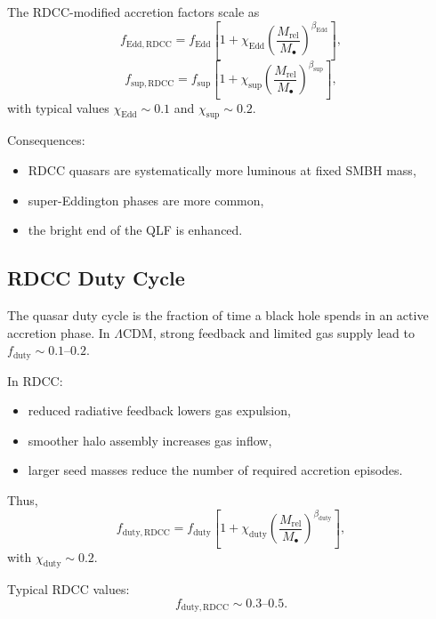 \documentclass[11pt,a4paper]{article}
\begin{document}
The RDCC-modified accretion factors scale as
\begin{equation}
f_{\mathrm{Edd,RDCC}}
=
f_{\mathrm{Edd}}
\left[
1
+
\chi_{\mathrm{Edd}}
\left(
\frac{M_{\mathrm{rel}}}{M_{\bullet}}
\right)^{\beta_{\mathrm{Edd}}}
\right],
\end{equation}
\begin{equation}
f_{\mathrm{sup,RDCC}}
=
f_{\mathrm{sup}}
\left[
1
+
\chi_{\mathrm{sup}}
\left(
\frac{M_{\mathrm{rel}}}{M_{\bullet}}
\right)^{\beta_{\mathrm{sup}}}
\right],
\end{equation}
with typical values $\chi_{\mathrm{Edd}} \sim 0.1$ and $\chi_{\mathrm{sup}} \sim 0.2$.

Consequences:
\begin{itemize}
\item RDCC quasars are systematically more luminous at fixed SMBH mass,
\item super-Eddington phases are more common,
\item the bright end of the QLF is enhanced.
\end{itemize}

\subsection{RDCC Duty Cycle}

The quasar duty cycle is the fraction of time a black hole spends in an active accretion phase.
In $\Lambda$CDM, strong feedback and limited gas supply lead to
$f_{\mathrm{duty}} \sim 0.1$–$0.2$.

In RDCC:
\begin{itemize}
\item reduced radiative feedback lowers gas expulsion,
\item smoother halo assembly increases gas inflow,
\item larger seed masses reduce the number of required accretion episodes.
\end{itemize}

Thus,
\begin{equation}
f_{\mathrm{duty,RDCC}}
=
f_{\mathrm{duty}}
\left[
1
+
\chi_{\mathrm{duty}}
\left(
\frac{M_{\mathrm{rel}}}{M_{\bullet}}
\right)^{\beta_{\mathrm{duty}}}
\right],
\end{equation}
with $\chi_{\mathrm{duty}} \sim 0.2$.

Typical RDCC values:
\begin{equation}
f_{\mathrm{duty,RDCC}}
\sim
0.3\text{--}0.5.
\end{equation}
\end{document}
